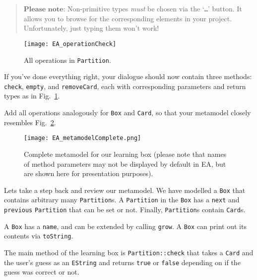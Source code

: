 \vspace{-.5cm}
\begin{quote}
$\textbf{Please note:}$ Non-primitive types \emph{must} be chosen via the `\texttt{\ldots}' button. It allows you to browse for the corresponding elements in your project. Unfortunately, just typing them won't work!
\end{quote}
\vspace{-.5cm}

\pagebreak

\begin{figure}[htbp]
	\centering
  \texttt{[image: EA\_operationCheck]}
	\caption{All operations in \texttt{Partition}.}
	\label{fig:operation_partition}
\end{figure}

If you've done everything right, your dialogue should now contain three methods: \texttt{check}, \texttt{empty}, and \texttt{removeCard}, each with corresponding parameters and return types as in Fig.~\ref{fig:operation_partition}.

Add all operations analogously for \texttt{Box} and \texttt{Card}, so that your metamodel closely resembles Fig.~\ref{fig:metamodel_complete}.

\begin{figure}[htbp]
	\centering
  \texttt{[image: EA\_metamodelComplete.png]}
	\caption[Complete metamodel for our learning box.]{Complete metamodel for our learning box (please note that names of method parameters may not be displayed by default in EA, but are shown here for presentation purposes).}
	\label{fig:metamodel_complete}
\end{figure}


Lets take a step back and review our metamodel.
We have modelled a \texttt{Box} that contains arbitrary many \texttt{Partition}s.
A \texttt{Partition} in the \texttt{Box} has a \texttt{next} and \texttt{previous} \texttt{Partition} that can be set or not. Finally, \texttt{Partition}s contain \texttt{Card}s.

A \texttt{Box} has a \texttt{name}, and can be extended by calling \texttt{grow}.
A \texttt{Box} can print out its contents via \texttt{toString}.

The main method of the learning box is \texttt{Partition::check} that takes a \texttt{Card} and the user's guess as an \texttt{EString} and returns \texttt{true} or \texttt{false} depending on if the guess was correct or not.

\pagebreak 

